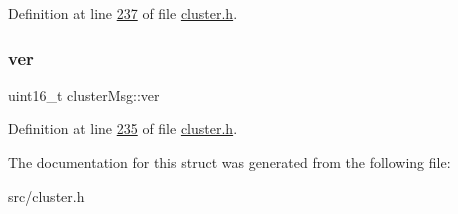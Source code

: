 Definition at line \hyperlink{cluster_8h_source_l00237}{237} of file \hyperlink{cluster_8h_source}{cluster.\+h}.

\mbox{\label{structclusterMsg_a27c8382011859c9773f0303f59bac116}} 
\subsubsection{\texorpdfstring{ver}{ver}}
{\footnotesize\ttfamily uint16\+\_\+t cluster\+Msg\+::ver}



Definition at line \hyperlink{cluster_8h_source_l00235}{235} of file \hyperlink{cluster_8h_source}{cluster.\+h}.



The documentation for this struct was generated from the following file\+:\begin{DoxyCompactItemize}
\item 
src/cluster.\+h\end{DoxyCompactItemize}
